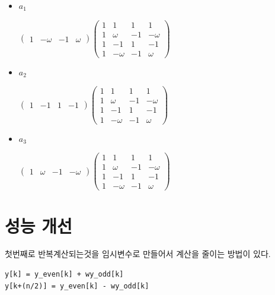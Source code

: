 \documentclass{oblivoir}
\begin{document}
\begin{itemize}
    \item $a_1$
    
    $
        \begin{pmatrix}
            1 & -\omega & -1 & \omega
        \end{pmatrix}
        \begin{pmatrix}
            1 & 1 & 1 & 1 \\
            1 & \omega & -1 & -\omega \\
            1 & -1 & 1 & -1 \\
            1 & -\omega & -1 & \omega 
        \end{pmatrix}
    $
    
    \item $a_2$
    
    $
    \begin{pmatrix}
        1 & -1 & 1 & -1
    \end{pmatrix}
    \begin{pmatrix}
        1 & 1 & 1 & 1 \\
        1 & \omega & -1 & -\omega \\
        1 & -1 & 1 & -1 \\
        1 & -\omega & -1 & \omega 
    \end{pmatrix}
    $
    \item $a_3$
    

    $
    \begin{pmatrix}
        1 & \omega & -1 & -\omega
    \end{pmatrix}
    \begin{pmatrix}
        1 & 1 & 1 & 1 \\
        1 & \omega & -1 & -\omega \\
        1 & -1 & 1 & -1 \\
        1 & -\omega & -1 & \omega 
    \end{pmatrix}
    $
\end{itemize}



\section{성능 개선}


첫번째로 반복계산되는것을 임시변수로 만들어서 계산을 줄이는 방법이 있다.

\begin{lstlisting}[style = CStyle]
y[k] = y_even[k] + wy_odd[k]
y[k+(n/2)] = y_even[k] - wy_odd[k]
\end{lstlisting}
\end{document}
